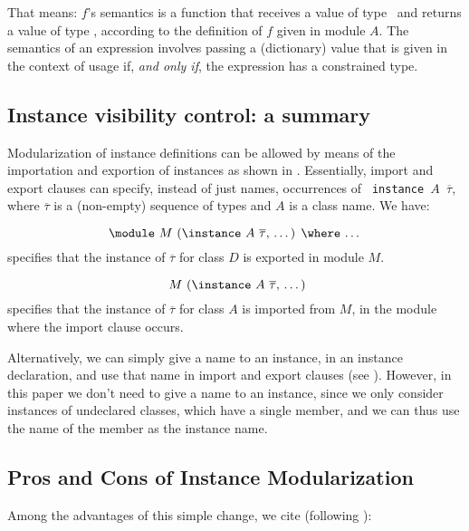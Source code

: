 That means: $f$'s semantics is a function that receives a value of
type \String\ and returns a value of type \String, according to the
definition of $f$ given in module $A$. The semantics of an expression
involves passing a (dictionary) value that is given in the context of
usage if, {\em and only if}, the expression has a constrained type.

\subsection{Instance visibility control: a summary}
\label{subsec:instance-visibility-control}

Modularization of instance definitions can be allowed by means of the
importation and exportion of instances as shown in
\cite{Controlling-scope-instances}. Essentially, import and export
clauses can specify, instead of just names, occurrences of {\tt
  instance $A$ $\overline{\tau}$}, where $\overline{\tau}$ is a
(non-empty) sequence of types and $A$ is a class name.  We have:

  \[ \text{\module\ $M$ (\instance\ $A$ $\overline{\tau}$, \ldots) \where\ \ldots} \]
specifies that the instance of $\overline{\tau}$ for class $D$ is
exported in module $M$.

  \[ \text{\ $M$ (\instance\ $A$ $\overline{\tau}$, \ldots)} \]
specifies that the instance of $\overline{\tau}$ for class $A$ is
imported from $M$, in the module where the import clause occurs.

Alternatively, we can simply give a name to an instance, in an
instance declaration, and use that name in import and export clauses
(see \cite{Controlling-scope-instances}). However, in this paper we
don't need to give a name to an instance, since we only consider
instances of undeclared classes, which have a single member, and we
can thus use the name of the member as the instance name. 


\subsection{Pros and Cons of Instance Modularization}

Among the advantages of this simple change, we cite (following
\cite{Controlling-scope-instances}):

